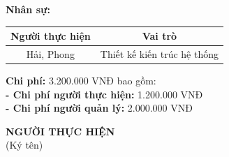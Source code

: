 {\begin{minipage}{\textwidth}
        \noindent \textbf{Nhân sự:}
        \begin{longtable}{|c|c|}
        \hline
        \textbf{Người thực hiện} & \textbf{Vai trò} \\
        \hline
        Hải, Phong & Thiết kế kiến trúc hệ thống \\
        \hline
        \end{longtable}
        \noindent \textbf{Chi phí:} 3.200.000 VNĐ bao gồm:\\
        \noindent \textbf{  - Chi phí người thực hiện:} 1.200.000 VNĐ\\
        \noindent \textbf{  - Chi phí người quản lý:} 2.000.000 VNĐ
        \vspace{1cm}
        \begin{flushleft}
            \hspace{8cm} \textbf{NGƯỜI THỰC HIỆN} \\
            \hspace{9.5cm} (Ký tên) \\
            \vspace{1cm}
        \end{flushleft}
    \end{minipage}
}
